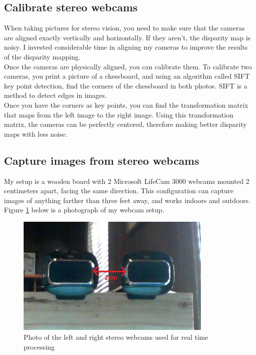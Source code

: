 \documentclass[11pt,fleqn]{article}
\begin{document}
\subsection{Calibrate stereo webcams}
When taking pictures for stereo vision, you need to make sure that the cameras are aligned exactly vertically and horizontally. If they aren't, the disparity map is noisy. I invested considerable time in aligning my cameras to improve the results of the disparity mapping.\\[5pt]
%
Once the cameras are physically aligned, you can calibrate them. To calibrate two cameras, you print a picture of a chessboard, and using an algorithm called SIFT key point detection, find the corners of the chessboard in both photos. SIFT is a method to detect edges in images. \\[5pt]
%
Once you have the corners as key points, you can find the transformation matrix that maps from the left image to the right image. Using this transformation matrix, the cameras can be perfectly centered, therefore making better disparity maps with less noise.

\subsection{Capture images from stereo webcams}
My setup is a wooden board with 2 Microsoft LifeCam 3000 webcams mounted 2 centimeters apart, facing the same direction. This configuration can capture images of anything farther than three feet away, and works indoors and outdoors. Figure \ref{fig:cam} below is a photograph of my webcam setup.\\

\begin{figure}[!h]
\begin{mdframed}
\centering
\includegraphics[width=0.85\textwidth, trim=30 50 45 50, clip]{images/setup.jpg}
\caption[Photo of the stereo webcams used for real time processing]{Photo of the left and right stereo webcams used for real time processing}
\label{fig:cam}
\end{mdframed}
\end{figure}
\end{document}
